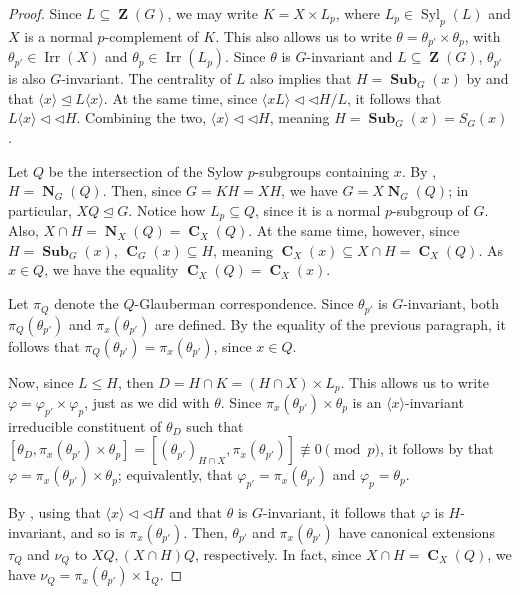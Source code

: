 \documentclass[12pt]{amsart}
\DeclareMathOperator{\ZB}{\mathbf{Z}}
\DeclareMathOperator{\CB}{\mathbf{C}}
\DeclareMathOperator{\NB}{\mathbf{N}}
\DeclareMathOperator{\Syl}{Syl}
\DeclareMathOperator{\Sub}{\mathbf{Sub}}
\DeclareMathOperator{\Irr}{Irr}
\theoremstyle{remark}
\theoremstyle{definition}
\theoremstyle{plain}
\theoremstyle{definition}
\numberwithin{equation}{section}
\begin{document}
\begin{proof}
	Since $L \subseteq \ZB(G)$, we may write $K = X \times L_p$, where $L_p \in \Syl_p(L)$ and $X$ is a normal $p$-complement of $K$. This also allows us to write $\theta = \theta_{p'} \times \theta_p$, with $\theta_{p'} \in \Irr(X)$ and $\theta_p \in \Irr(L_p)$. Since $\theta$ is $G$-invariant and $L \subseteq \ZB(G)$, $\theta_{p'}$ is also $G$-invariant. The centrality of $L$ also implies that $H = \Sub_G(x)$ by  and that $\langle x \rangle \unlhd L \langle x \rangle$. At the same time, since $\langle xL \rangle {\triangleleft}{\triangleleft} H/L$, it follows that $L \langle x \rangle {\triangleleft}{\triangleleft} H$. Combining the two, $\langle x \rangle {\triangleleft}{\triangleleft} H$, meaning $H = \Sub_G(x) = S_G(x)$.
	
	Let $Q$ be the intersection of the Sylow $p$-subgroups containing $x$. By , $H = \NB_G(Q)$. Then, since $G = KH = XH$, we have $G = X\NB_G(Q)$; in particular, $XQ \unlhd G$. Notice how $L_p \subseteq Q$, since it is a normal $p$-subgroup of $G$. Also, $X \cap H = \NB_X(Q) = \CB_X(Q)$. At the same time, however, since $H = \Sub_G(x)$, $\CB_G(x) \subseteq H$, meaning $\CB_X(x) \subseteq X \cap H = \CB_X(Q)$. As $x \in Q$, we have the equality $\CB_X(Q) = \CB_X(x)$.
	
	Let $\pi_Q$ denote the $Q$-Glauberman correspondence. Since $\theta_{p'}$ is $G$-invariant, both $\pi_Q(\theta_{p'})$ and $\pi_x(\theta_{p'})$ are defined. By the equality of the previous paragraph, it follows that $\pi_Q(\theta_{p'}) = \pi_x(\theta_{p'})$, since $x \in Q$.
	
	Now, since $L \leq H$, then $D = H \cap K = (H \cap X) \times L_p$. This allows us to write $\varphi = \varphi_{p'} \times \varphi_p$, just as we did with $\theta$. Since $\pi_x(\theta_{p'}) \times \theta_p$ is an $\langle x \rangle$-invariant irreducible constituent of $\theta_D$ such that $[\theta_D, \pi_x(\theta_{p'}) \times \theta_p] = [(\theta_{p'})_{H \cap X}, \pi_x(\theta_{p'})] \not \equiv 0 \pmod{p}$, it follows by  that $\varphi = \pi_x(\theta_{p'}) \times \theta_p$; equivalently, that $\varphi_{p'} = \pi_x(\theta_{p'})$ and $\varphi_p = \theta_p$.
	
	By , using that $\langle x \rangle {\triangleleft}{\triangleleft} H$ and that $\theta$ is $G$-invariant, it follows that $\varphi$ is $H$-invariant, and so is $\pi_x(\theta_{p'})$. Then, $\theta_{p'}$ and $\pi_x(\theta_{p'})$ have canonical extensions $\tau_Q$ and $\nu_Q$ to $XQ, (X \cap H)Q$, respectively. In fact, since $X \cap H = \CB_X(Q)$, we have $\nu_Q = \pi_x(\theta_{p'}) \times 1_Q$.
	

\end{proof}
\end{document}
